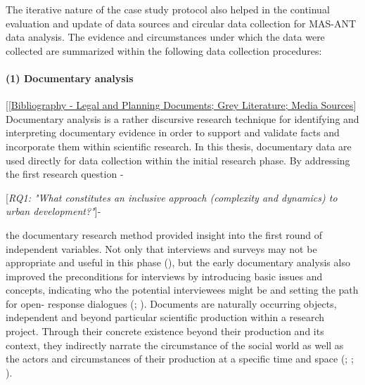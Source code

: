 \documentclass[11pt]{report}
\begin{document}
The iterative nature of the case study protocol also helped in the continual evaluation and update of data sources and circular data collection for MAS-ANT data analysis. The evidence and circumstances under which the data were collected are summarized within the following data collection procedures: 

\paragraph{(1) Documentary analysis} 
[\href{Bibliography}{[Bibliography - Legal and Planning Documents; Grey Literature; Media Sources}]
\\

Documentary analysis is a rather discursive research technique for identifying and interpreting documentary evidence in order to support and validate facts and incorporate them within scientific research. In this thesis, documentary data are used directly for data collection within the initial research phase. By addressing the first research question -

[\textit{RQ1: "What constitutes an inclusive approach (complexity and dynamics) to urban development?"}]-

the documentary research method provided insight into the first round of independent variables.
Not only that interviews and surveys may not be appropriate and useful in this phase (\href{Mogalakwe}{\cite{mogalakwe_use_2006}}), but the early documentary analysis also improved the preconditions for interviews by introducing basic issues and concepts, indicating who the potential interviewees might be and setting the path for open- response dialogues (\href{Robson}{\citealt{robson_real_1993}}; \href{Grubovic}{\citep{grubovic_belgrade_2006}}).
Documents are naturally occurring objects, independent and beyond particular scientific production within a research project. Through their concrete existence beyond their production and its context, they indirectly narrate the circumstance of the social world as well as the actors and circumstances of their production at a specific time and space (\href{Jary}{\cite{jary_harpercollins_1991}}; \href{Payne}{\citealt{payne_key_2004}}; \href{Mogalakwe}{\cite{mogalakwe_use_2006}}).
\\
\end{document}
